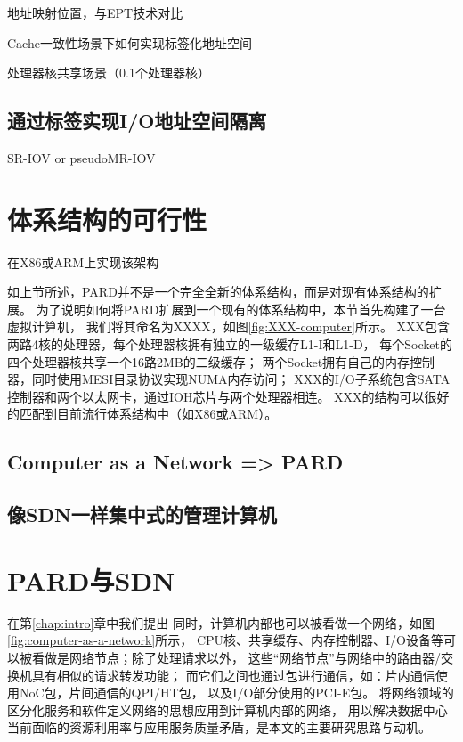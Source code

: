 地址映射位置，与EPT技术对比

Cache一致性场景下如何实现标签化地址空间

处理器核共享场景（0.1个处理器核）

\subsection{通过标签实现I/O地址空间隔离}

SR-IOV or pseudoMR-IOV





\section{体系结构的可行性}

在X86或ARM上实现该架构


如上节所述，PARD并不是一个完全全新的体系结构，而是对现有体系结构的扩展。
为了说明如何将PARD扩展到一个现有的体系结构中，本节首先构建了一台虚拟计算机，
我们将其命名为XXXX，如图\ref{fig:XXX-computer}所示。
XXX包含两路4核的处理器，每个处理器核拥有独立的一级缓存L1-I和L1-D，
每个Socket的四个处理器核共享一个16路2MB的二级缓存；
两个Socket拥有自己的内存控制器，同时使用MESI目录协议实现NUMA内存访问；
XXX的I/O子系统包含SATA控制器和两个以太网卡，通过IOH芯片与两个处理器相连。
XXX的结构可以很好的匹配到目前流行体系结构中（如X86或ARM）。

\subsection{Computer as a Network => PARD}

\subsection{像SDN一样集中式的管理计算机}

\section{PARD与SDN}

在第\ref{chap:intro}章中我们提出
同时，计算机内部也可以被看做一个网络，如图\ref{fig:computer-as-a-network}所示，
CPU核、共享缓存、内存控制器、I/O设备等可以被看做是网络节点；除了处理请求以外，
这些“网络节点”与网络中的路由器/交换机具有相似的请求转发功能；
而它们之间也通过包进行通信，如：片内通信使用NoC包，片间通信的QPI/HT包，
以及I/O部分使用的PCI-E包。
将网络领域的区分化服务和软件定义网络的思想应用到计算机内部的网络，
用以解决数据中心当前面临的资源利用率与应用服务质量矛盾，是本文的主要研究思路与动机。


